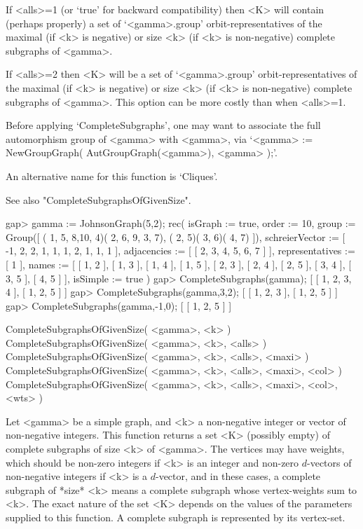 If <alls>=1 (or `true' for backward compatibility) then <K> will contain
(perhaps properly) a set of `<gamma>.group' orbit-representatives of
the maximal (if <k> is negative) or size <k> (if <k> is non-negative)
complete subgraphs of <gamma>.

If <alls>=2 then <K> will be a set of `<gamma>.group'
orbit-representatives of the maximal (if <k> is negative) or size <k>
(if <k> is non-negative) complete subgraphs of <gamma>.  This option
can be more costly than when <alls>=1.

Before applying `CompleteSubgraphs', one may want to associate the full
automorphism group of <gamma> with <gamma>, via `<gamma> :=
NewGroupGraph( AutGroupGraph(<gamma>), <gamma> );'.

An alternative name for this function is `Cliques'.

See also "CompleteSubgraphsOfGivenSize".

\beginexample
gap> gamma := JohnsonGraph(5,2);
rec( isGraph := true, order := 10, 
  group := Group([ ( 1, 5, 8,10, 4)( 2, 6, 9, 3, 7), ( 2, 5)( 3, 6)( 4, 7) ]),
  schreierVector := [ -1, 2, 2, 1, 1, 1, 2, 1, 1, 1 ], 
  adjacencies := [ [ 2, 3, 4, 5, 6, 7 ] ], representatives := [ 1 ], 
  names := [ [ 1, 2 ], [ 1, 3 ], [ 1, 4 ], [ 1, 5 ], [ 2, 3 ], [ 2, 4 ], 
      [ 2, 5 ], [ 3, 4 ], [ 3, 5 ], [ 4, 5 ] ], isSimple := true )
gap> CompleteSubgraphs(gamma);
[ [ 1, 2, 3, 4 ], [ 1, 2, 5 ] ]
gap>  CompleteSubgraphs(gamma,3,2);
[ [ 1, 2, 3 ], [ 1, 2, 5 ] ]
gap> CompleteSubgraphs(gamma,-1,0);
[ [ 1, 2, 5 ] ]
\endexample


\>CompleteSubgraphsOfGivenSize( <gamma>, <k> )
\>CompleteSubgraphsOfGivenSize( <gamma>, <k>, <alls> )
\>CompleteSubgraphsOfGivenSize( <gamma>, <k>, <alls>, <maxi> )
\>CompleteSubgraphsOfGivenSize( <gamma>, <k>, <alls>, <maxi>, <col> )
\>CompleteSubgraphsOfGivenSize( <gamma>, <k>, <alls>, <maxi>, <col>, <wts> ) 

Let <gamma> be a simple graph, and <k> a non-negative integer or vector
of non-negative integers.  This function returns a set <K> (possibly
empty) of complete subgraphs of size <k> of <gamma>.  The vertices may
have weights, which should be non-zero integers if <k> is an integer and
non-zero $d$-vectors of non-negative integers if <k> is a $d$-vector,
and in these cases, a complete subgraph of *size* <k> means a complete
subgraph whose vertex-weights sum to <k>.  The exact nature of the set
<K> depends on the values of the parameters supplied to this function. A
complete subgraph is represented by its vertex-set.

